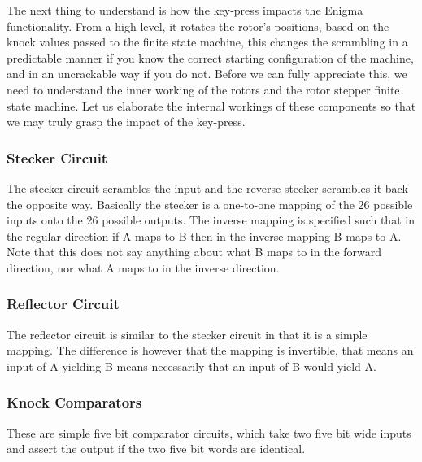 \documentclass{article}
\begin{document}
The next thing to understand is how the key-press impacts the Enigma functionality. From a high level, it rotates the rotor's positions, based on the knock values passed to the finite state machine, this changes the scrambling in a predictable manner if you know the correct starting configuration of the machine, and in an uncrackable way if you do not.  Before we can fully appreciate this, we need to understand the inner working of the rotors and the rotor stepper finite state machine. Let us elaborate the internal workings of these components so that we may truly grasp the impact of the key-press. 

\subsubsection{Stecker Circuit}
The stecker circuit scrambles the input and the reverse stecker scrambles it back the opposite way. Basically the stecker is a one-to-one mapping of the 26 possible inputs onto the 26 possible outputs. The inverse mapping is specified such that in the regular direction if A maps to B then in the inverse mapping B maps to A. Note that this does not say anything about what B maps to in the forward direction, nor what A maps to in the inverse direction. 

\subsubsection{Reflector Circuit}
The reflector circuit is similar to the stecker circuit in that it is a simple mapping. The difference is however that the mapping is invertible, that means an input of A yielding B means necessarily that an input of B would yield A.

\subsubsection{Knock Comparators}
These are simple five bit comparator circuits, which take two five bit wide inputs and assert the output if the two five bit words are identical. 
\end{document}
